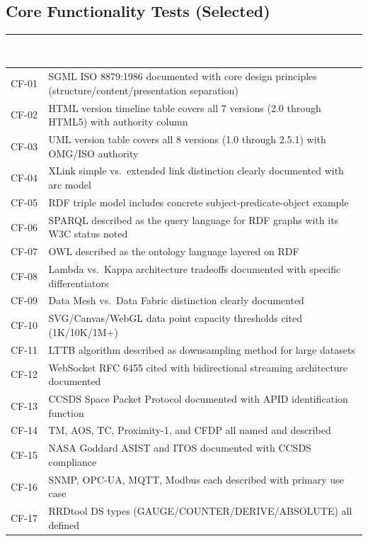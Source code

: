 \documentclass[11pt,letterpaper]{article}
\newcommand{\tableheader}[1]{\textbf{\sffamily\textcolor{white}{#1}}}
\begin{document}
\subsection{Core Functionality Tests (Selected)}

\begin{center}
\begin{tabularx}{\textwidth}{L{1.5cm}X}
\toprule
{}
\tableheader{Test ID} & \tableheader{Verifies} \\
\midrule
CF-01 & SGML ISO 8879:1986 documented with core design principles (structure/content/presentation separation) \\
CF-02 & HTML version timeline table covers all 7 versions (2.0 through HTML5) with authority column \\
CF-03 & UML version table covers all 8 versions (1.0 through 2.5.1) with OMG/ISO authority \\
CF-04 & XLink simple vs.\ extended link distinction clearly documented with arc model \\
CF-05 & RDF triple model includes concrete subject-predicate-object example \\
CF-06 & SPARQL described as the query language for RDF graphs with its W3C status noted \\
CF-07 & OWL described as the ontology language layered on RDF \\
CF-08 & Lambda vs.\ Kappa architecture tradeoffs documented with specific differentiators \\
CF-09 & Data Mesh vs.\ Data Fabric distinction clearly documented \\
CF-10 & SVG/Canvas/WebGL data point capacity thresholds cited (1K/10K/1M+) \\
CF-11 & LTTB algorithm described as downsampling method for large datasets \\
CF-12 & WebSocket RFC 6455 cited with bidirectional streaming architecture documented \\
CF-13 & CCSDS Space Packet Protocol documented with APID identification function \\
CF-14 & TM, AOS, TC, Proximity-1, and CFDP all named and described \\
CF-15 & NASA Goddard ASIST and ITOS documented with CCSDS compliance \\
CF-16 & SNMP, OPC-UA, MQTT, Modbus each described with primary use case \\
CF-17 & RRDtool DS types (GAUGE/COUNTER/DERIVE/ABSOLUTE) all defined \\

\end{tabularx}
\end{center}
\end{document}
